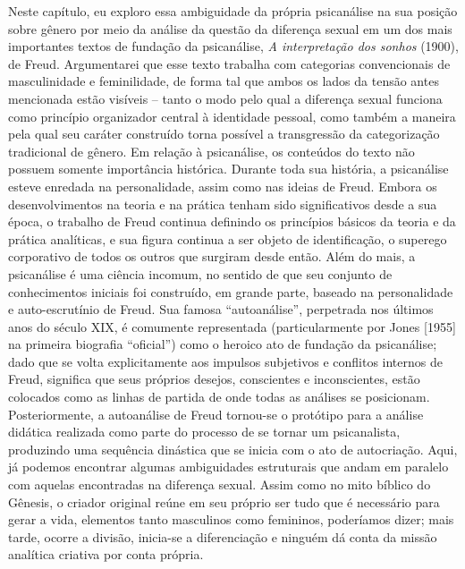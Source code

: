 Neste capítulo, eu exploro essa ambiguidade da própria psicanálise na
sua posição sobre gênero por meio da análise da questão da diferença
sexual em um dos mais importantes textos de fundação da psicanálise,
\emph{A interpretação dos sonhos} (1900), de Freud. Argumentarei que
esse texto trabalha com categorias convencionais de masculinidade e
feminilidade, de forma tal que ambos os lados da tensão antes mencionada
estão visíveis -- tanto o modo pelo qual a diferença sexual funciona
como princípio organizador central à identidade pessoal, como também a
maneira pela qual seu caráter construído torna possível a transgressão
da categorização tradicional de gênero. Em relação à psicanálise, os
conteúdos do texto não possuem somente importância histórica. Durante
toda sua história, a psicanálise esteve enredada na personalidade, assim
como nas ideias de Freud. Embora os desenvolvimentos na teoria e na
prática tenham sido significativos desde a sua época, o trabalho de
Freud continua definindo os princípios básicos da teoria e da prática
analíticas, e sua figura continua a ser objeto de identificação, o
superego corporativo de todos os outros que surgiram desde então. Além
do mais, a psicanálise é uma ciência incomum, no sentido de que seu
conjunto de conhecimentos iniciais foi construído, em grande parte,
baseado na personalidade e auto-escrutínio de Freud. Sua famosa
``autoanálise'', perpetrada nos últimos anos do século XIX, é comumente
representada (particularmente por Jones {[}1955{]} na primeira biografia
``oficial'') como o heroico ato de fundação da psicanálise; dado que se
volta explicitamente aos impulsos subjetivos e conflitos internos de
Freud, significa que seus próprios desejos, conscientes e inconscientes,
estão colocados como as linhas de partida de onde todas as análises se
posicionam. Posteriormente, a autoanálise de Freud tornou-se o protótipo
para a análise didática realizada como parte do processo de se tornar um
psicanalista, produzindo uma sequência dinástica que se inicia com o ato
de autocriação. Aqui, já podemos encontrar algumas ambiguidades
estruturais que andam em paralelo com aquelas encontradas na diferença
sexual. Assim como no mito bíblico do Gênesis, o criador original reúne
em seu próprio ser tudo que é necessário para gerar a vida, elementos
tanto masculinos como femininos, poderíamos dizer; mais tarde, ocorre a
divisão, inicia-se a diferenciação e ninguém dá conta da missão
analítica criativa por conta própria.

